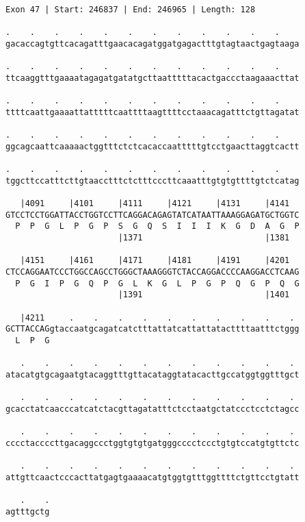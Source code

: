 \documentclass{article}
\begin{document}
\newpage
\begin{Verbatim}[fontfamily=courier]
Exon 47 | Start: 246837 | End: 246965 | Length: 128

.    .    .    .    .    .    .    .    .    .    .    .    
gacaccagtgttcacagatttgaacacagatggatgagactttgtagtaactgagtaaga

.    .    .    .    .    .    .    .    .    .    .    .    
ttcaaggtttgaaaatagagatgatatgcttaatttttacactgaccctaagaaacttat

.    .    .    .    .    .    .    .    .    .    .    .    
ttttcaattgaaaattatttttcaattttaagttttcctaaacagatttctgttagatat

.    .    .    .    .    .    .    .    .    .    .    .    
ggcagcaattcaaaaactggtttctctcacaccaatttttgtcctgaacttaggtcactt

.    .    .    .    .    .    .    .    .    .    .    .    
tggcttccatttcttgtaacctttctctttcccttcaaatttgtgtgttttgtctcatag

   |4091     |4101     |4111     |4121     |4131     |4141  
GTCCTCCTGGATTACCTGGTCCTTCAGGACAGAGTATCATAATTAAAGGAGATGCTGGTC
  P  P  G  L  P  G  P  S  G  Q  S  I  I  I  K  G  D  A  G  P
                       |1371                         |1381  

   |4151     |4161     |4171     |4181     |4191     |4201  
CTCCAGGAATCCCTGGCCAGCCTGGGCTAAAGGGTCTACCAGGACCCCAAGGACCTCAAG
  P  G  I  P  G  Q  P  G  L  K  G  L  P  G  P  Q  G  P  Q  G
                       |1391                         |1401  

   |4211     .    .    .    .    .    .    .    .    .    . 
GCTTACCAGgtaccaatgcagatcatctttattatcattattatacttttaatttctggg
  L  P  G                                                   

   .    .    .    .    .    .    .    .    .    .    .    . 
atacatgtgcagaatgtacaggtttgttacataggtatacacttgccatggtggtttgct

   .    .    .    .    .    .    .    .    .    .    .    . 
gcacctatcaacccatcatctacgttagatatttctcctaatgctatccctcctctagcc

   .    .    .    .    .    .    .    .    .    .    .    . 
cccctaccccttgacaggccctggtgtgtgatgggcccctccctgtgtccatgtgttctc

   .    .    .    .    .    .    .    .    .    .    .    . 
attgttcaactcccacttatgagtgaaaacatgtggtgtttggttttctgttcctgtatt

   .    .
agtttgctg
\end{Verbatim}
\newpage
\end{document}
